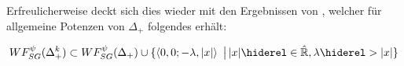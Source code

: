 Erfreulicherweise deckt sich dies wieder mit den Ergebnissen von \textcite[Cor. 3.70]{Schulz2014}, welcher für allgemeine Potenzen von $\Delta_+$ folgendes erhält:

\begin{equation*}
    WF_{SG}^\psi (\Delta_+^k) \subset
    WF_{SG}^\psi(\Delta_+) \cup
    \{\left\langle0,0;-\lambda, |x|\right\rangle\ \big| \, |x| \hiderel\in \hat{\mathbb{R}}, \lambda \hiderel > |x|\}
\end{equation*}









